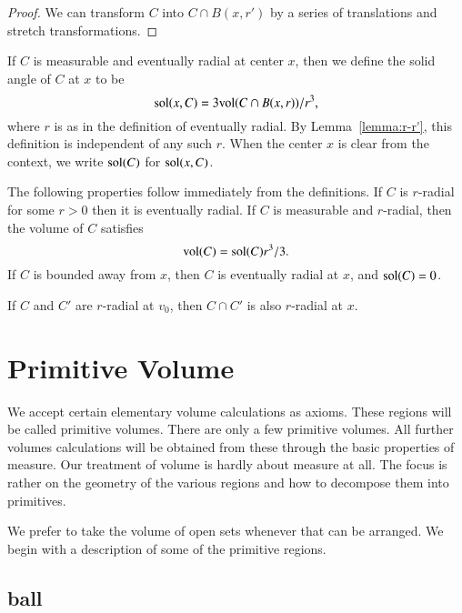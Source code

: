 \begin{proof}  We can transform $C$ into $C\cap B(x,r')$ by
a series of translations and stretch transformations.
\end{proof}


\begin{definition}
If $C$ is measurable and eventually radial at center $x$, then we
define the solid angle of $C$ at $x$ to be
    $$
    {\operatorname{sol}}(x,C) = 3 {\operatorname{vol}}(C\cap B(x,r))/r^3,
    $$
where $r$ is as in the definition of eventually radial. 
By Lemma~\ref{lemma:r-r'}, this
definition is independent of any such $r$.  When the center $x$ is
clear from the context, we write ${\operatorname{sol}}(C)$ for
${\operatorname{sol}}(x,C)$.
\end{definition}



The following properties follow immediately from the definitions.
If $C$ is $r$-radial for some $r>0$ then it is eventually radial.
If $C$ is measurable and $r$-radial, then the volume of $C$
satisfies
    $$
    {\operatorname{vol}}(C) = {\operatorname{sol}}(C) r^3/3.
    $$
If $C$ is bounded away from $x$, then $C$ is eventually radial at
$x$, and ${\operatorname{sol}}(C) = 0$.

\begin{lemma}  If $C$ and $C'$ are  $r$-radial
at $v_0$, then $C\cap C'$ is also $r$-radial at
$x$.
\end{lemma}






\section{Primitive Volume}

We accept 
certain elementary volume calculations as axioms.  
These regions will be called primitive volumes.  There are only
a few primitive volumes.
All further
volumes calculations will be obtained from these through the basic
properties of measure.   
Our treatment of volume 
is hardly about measure at all.  The focus is rather on
the geometry of the various regions and how to decompose them into
primitives.

We prefer to take the volume of open sets whenever that can be
arranged.  We begin with a description of some of the primitive
regions.






\subsection{ball}


